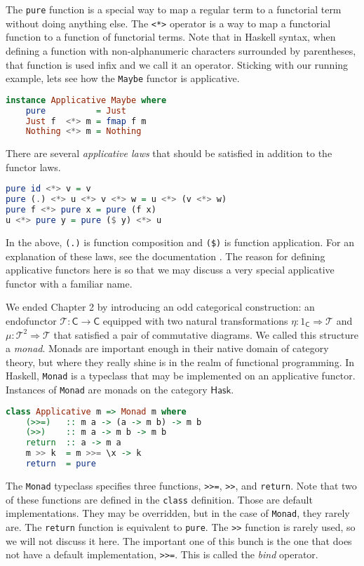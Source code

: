 \documentclass[MS, xcolor=dvipsnames]{wfuthesis}
\def\sC{\mathsf{C}}
\def\cT{\mathcal{T}}
\def\Hask{\mathsf{Hask}}
\theoremstyle{definition}
\begin{document}
The \lstinline{pure} function is a special way to map a regular term to a functorial term without doing anything else. The \lstinline{<*>} operator is a way to map a functorial function to a function of functorial terms. Note that in Haskell syntax, when defining a function with non-alphanumeric characters surrounded by parentheses, that function is used infix and we call it an operator. Sticking with our running example, lets see how the \lstinline{Maybe} functor is applicative.
\begin{lstlisting}[language=Haskell]
instance Applicative Maybe where
    pure          = Just
    Just f  <*> m = fmap f m
    Nothing <*> m = Nothing
\end{lstlisting}
There are several \emph{applicative laws} that should be satisfied in addition to the functor laws.
\begin{lstlisting}[language=Haskell]
pure id <*> v = v
pure (.) <*> u <*> v <*> w = u <*> (v <*> w)
pure f <*> pure x = pure (f x)
u <*> pure y = pure ($ y) <*> u
\end{lstlisting}
In the above, \lstinline{(.)} is function composition and \lstinline{($)} is function application. For an explanation of these laws, see the documentation \cite{Prelude}. The reason for defining applicative functors here is so that we may discuss a very special applicative functor with a familiar name. \par
We ended Chapter 2 by introducing an odd categorical construction: an endofunctor $\cT: \sC \to \sC$ equipped with two natural transformations $\eta: 1_\sC \Rightarrow \cT$ and $\mu: \cT^2 \Rightarrow \cT$ that satisfied a pair of commutative diagrams. We called this structure a \emph{monad}. Monads are important enough in their native domain of category theory, but where they really shine is in the realm of functional programming. In Haskell, \lstinline{Monad} is a typeclass that may be implemented on an applicative functor. Instances of \lstinline{Monad} are monads on the category $\Hask$.
\begin{lstlisting}[language=Haskell]
class Applicative m => Monad m where
    (>>=)   :: m a -> (a -> m b) -> m b
    (>>)    :: m a -> m b -> m b
    return  :: a -> m a
    m >> k  = m >>= \x -> k
    return  = pure
\end{lstlisting}
The \lstinline{Monad} typeclass specifies three functions, \lstinline{>>=}, \lstinline{>>}, and \lstinline{return}. Note that two of these functions are defined in the \lstinline{class} definition. Those are default implementations. They may be overridden, but in the case of \lstinline{Monad}, they rarely are. The \lstinline{return} function is equivalent to \lstinline{pure}. The \lstinline{>>} function is rarely used, so we will not discuss it here. The important one of this bunch is the one that does not have a default implementation, \lstinline{>>=}. This is called the \emph{bind} operator. \par
\end{document}
